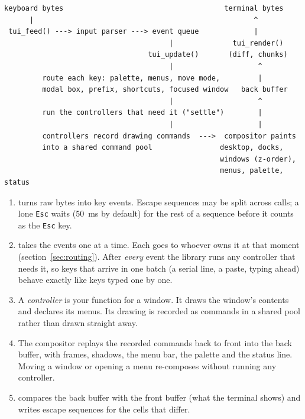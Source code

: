 \documentclass[11pt,a4paper]{article}
\newcommand{\fn}[1]{\texttt{\detokenize{#1}}}
\newcommand{\key}[1]{\texttt{#1}}
\begin{document}
\begin{lstlisting}[language={},frame=single]
 keyboard bytes                                      terminal bytes
      |                                                    ^
 tui_feed() ---> input parser ---> event queue             |
                                       |              tui_render()
                                  tui_update()       (diff, chunks)
                                       |                    ^
         route each key: palette, menus, move mode,         |
         modal box, prefix, shortcuts, focused window   back buffer
                                       |                    ^
         run the controllers that need it ("settle")        |
                                       |                    |
         controllers record drawing commands  --->  compositor paints
         into a shared command pool                desktop, docks,
                                                   windows (z-order),
                                                   menus, palette, status
\end{lstlisting}

\begin{enumerate}
\item \fn{tui_feed} turns raw bytes into key events. Escape sequences may be
  split across calls; a lone \key{Esc} waits \fn{esc_ms} (50~ms by default) for
  the rest of a sequence before it counts as the \key{Esc} key.
\item \fn{tui_update} takes the events one at a time. Each goes to whoever
  owns it at that moment (section~\ref{sec:routing}). After \emph{every}
  event the library runs any controller that needs it, so keys that arrive in
  one batch (a serial line, a paste, typing ahead) behave exactly like keys
  typed one by one.
\item A \emph{controller} is your function for a window. It draws the window's
  contents and declares its menus. Its drawing is recorded as commands in a
  shared pool rather than drawn straight away.
\item The compositor replays the recorded commands back to front into the
  back buffer, with frames, shadows, the menu bar, the palette and the status
  line. Moving a window or opening a menu re-composes without running any
  controller.
\item \fn{tui_render} compares the back buffer with the front buffer (what
  the terminal shows) and writes escape sequences for the cells that differ.
\end{enumerate}
\end{document}
